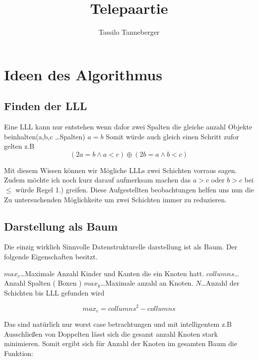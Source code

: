 \documentclass{article}
\begin{document}
\title{Telepaartie}
\author{Tassilo Tanneberger}

\maketitle

\section{Ideen des Algorithmus}

\subsection*{ Finden der LLL}

Eine LLL kann nur entstehen wenn dafor zwei Spalten die gleiche anzahl Objekte beinhalten(a,b,c \dots Spalten) \( a = b\) Somit würde auch gleich einen Schritt zufor gelten z.B 
\begin{equation}
	(2a = b \wedge a < c)  \oplus (2b = a \wedge b < c)
\end{equation}

Mit diesem Wissen können wir Mögliche LLLs zwei Schichten vorraus sagen. Zudem möchte ich noch kurz darauf aufmerksam machen das \(a>c\) oder \(b > c\) bei  \( \leq \) würde Regel 1.) greifen. Diese Aufgestellten beobachtungen helfen uns nun die Zu untersuchenden Möglichkeite um zwei Schichten immer zu reduzieren.

\subsection*{ Darstellung als Baum}

Die einzig wirklich Sinnvolle Datenstrukturelle darstellung ist als Baum. Der folgende Eigenschaften besitzt.
\newline

\(max_c\)\dots 				Maximale Anzahl Kinder und Kanten die ein Knoten hatt. \newline
\(collumns\)\dots 			Anzahl Spalten ( Boxen ) \newline
\(max_k\)\dots				Maximale anzahl an Knoten.  \newline
\(N\)\dots    					Anzahl der Schichten bis LLL gefunden wird

\begin{equation}
	max_c = collumns ^ 2 - collumns
\end{equation}

Das sind natürlich nur worst case betrachtungen und mit intelligentem z.B Ausschließen von Doppelten lässt sich die gesamt anzahl Knoten stark minimieren. Somit ergibt sich für Anzahl der Knoten im gesamten Baum die Funktion: \newline
\end{document}
